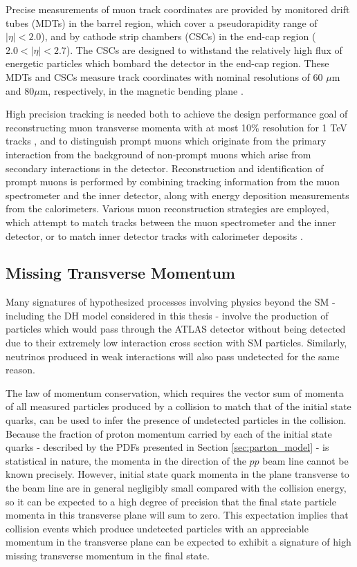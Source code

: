 Precise measurements of muon track coordinates are provided by monitored drift tubes (MDTs) in the barrel region, which cover a pseudorapidity range of $|\eta|<2.0$), and by cathode strip chambers (CSCs) in the end-cap region ($2.0<|\eta|<2.7$). The CSCs are designed to withstand the relatively high flux of energetic particles which bombard the detector in the end-cap region. These MDTs and CSCs measure track coordinates with nominal resolutions of 60 $\mu$m and 80$\mu$m, respectively, in the magnetic bending plane \cite{muon_reco}. 

High precision tracking is needed both to achieve the design performance goal of reconstructing muon transverse momenta with at most 10\% resolution for 1 TeV tracks \cite{atlas}, and to distinguish prompt muons which originate from the primary interaction from the background of non-prompt muons which arise from secondary interactions in the detector. Reconstruction and identification of prompt muons is performed by combining tracking information from the muon spectrometer and the inner detector, along with energy deposition measurements from the calorimeters. Various muon reconstruction strategies are employed, which attempt to match tracks between the muon spectrometer and the inner detector, or to match inner detector tracks with calorimeter deposits \cite{muon_reco}.

\subsection{Missing Transverse Momentum}
\label{sec:met}

Many signatures of hypothesized processes involving physics beyond the SM - including the DH model considered in this thesis - involve the production of particles which would pass through the ATLAS detector without being detected due to their extremely low interaction cross section with SM particles. Similarly, neutrinos produced in weak interactions will also pass undetected for the same reason. 

The law of momentum conservation, which requires the vector sum of momenta of all measured particles produced by a collision to match that of the initial state quarks, can be used to infer the presence of undetected particles in the collision. Because the fraction of proton momentum carried by each of the initial state quarks - described by the PDFs presented in Section \ref{sec:parton_model} - is statistical in nature, the momenta in the direction of the $pp$ beam line cannot be known precisely. However, initial state quark momenta in the plane transverse to the beam line are in general negligibly small compared with the collision energy, so it can be expected to a high degree of precision that the final state particle momenta in this transverse plane will sum to zero. This expectation implies that collision events which produce undetected particles with an appreciable momentum in the transverse plane can be expected to exhibit a signature of high missing transverse momentum in the final state. 

